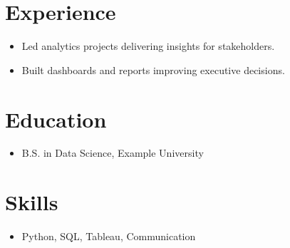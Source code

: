 \documentclass{article}
\begin{document}
\section{Experience}
\begin{itemize}
  \item Led analytics projects delivering insights for stakeholders.
  \item Built dashboards and reports improving executive decisions.
\end{itemize}
\section{Education}
\begin{itemize}
  \item B.S. in Data Science, Example University
\end{itemize}
\section{Skills}
\begin{itemize}
  \item Python, SQL, Tableau, Communication
\end{itemize}
\end{document}
